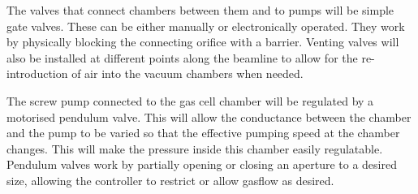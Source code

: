 The valves that connect chambers between them and to pumps will be simple gate valves. These can be either manually or electronically operated. They work by physically blocking the connecting orifice with a barrier. Venting valves will also be installed at different points along the beamline to allow for the re-introduction of air into the vacuum chambers when needed.

The screw pump connected to the gas cell chamber will be regulated by a motorised pendulum valve. This will allow the conductance between the chamber and the pump to be varied so that the effective pumping speed at the chamber changes. This will make the pressure inside this chamber easily regulatable. Pendulum valves work by partially opening or closing an aperture to a desired size, allowing the controller to restrict or allow gasflow as desired.



